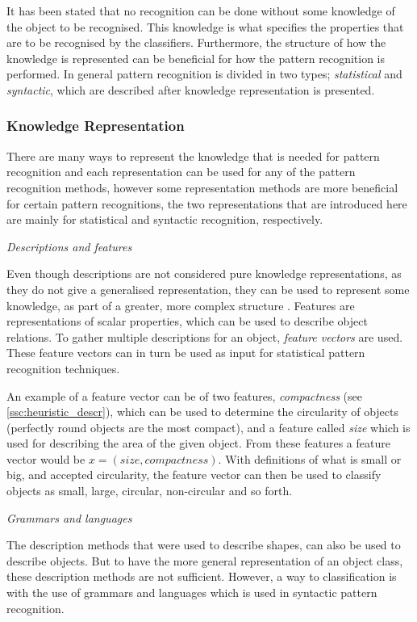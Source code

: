 It has been stated that no recognition can be done without some knowledge of the object to be recognised\citep[Page 381]{obj_recogn_book}. This knowledge is what specifies the properties that are to be recognised by the classifiers. Furthermore, the structure of how the knowledge is represented can be beneficial for how the pattern recognition is performed. In general pattern recognition is divided in two types; \textit{statistical} and \textit{syntactic}, which are described after knowledge representation is presented.\citep{obj_recogn_book}

\subsubsection{Knowledge Representation}\label{ssc:knowledge_representation}
There are many ways to represent the knowledge that is needed for pattern recognition and each representation can be used for any of the pattern recognition methods, however some representation methods are more beneficial for certain pattern recognitions, the two representations that are introduced here are mainly for statistical and syntactic recognition, respectively. 

\emph{Descriptions and features}

Even though descriptions are not considered pure knowledge representations, as they do not give a generalised representation, they can be used to represent some knowledge, as part of a greater, more complex structure \citep[Page 382]{obj_recogn_book}.
Features are representations of scalar properties, which can be used to describe object relations. To gather multiple descriptions for an object, \textit{feature vectors} are used. These feature vectors can in turn be used as input for statistical pattern recognition techniques.

An example of a feature vector can be of two features, \textit{compactness} (see \cref{ssc:heuristic_descr}), which can be used to determine the circularity of objects (perfectly round objects are the most compact), and a feature called \textit{size} which is used for describing the area of the given object. From these features a feature vector would be $x=(size, compactness)$. With definitions of what is small or big, and accepted circularity, the feature vector can then be used to classify objects as small, large, circular, non-circular and so forth.

\emph{Grammars and languages}

The description methods that were used to describe shapes, can also be used to describe objects. But to have the more general representation of an object class, these description methods are not sufficient. However, a way to classification is with the use of grammars and languages which is used in syntactic pattern recognition.


